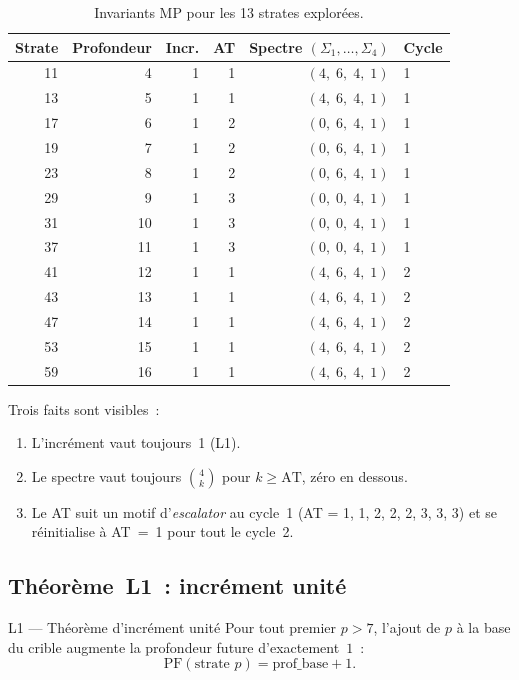 \documentclass[12pt,a4paper]{article}
\begin{document}
\begin{table}[htbp]
\centering
\caption{Invariants MP pour les 13 strates explorées.}
\label{tab:PM_shells}
\begin{tabular}{rrrrrl}
\toprule
Strate & Profondeur & Incr. & AT & Spectre $(\Sigma_1,\ldots,\Sigma_4)$ & Cycle \\
\midrule
11 &  4 & 1 & 1 & $(4,\;6,\;4,\;1)$ & 1 \\
13 &  5 & 1 & 1 & $(4,\;6,\;4,\;1)$ & 1 \\
17 &  6 & 1 & 2 & $(0,\;6,\;4,\;1)$ & 1 \\
19 &  7 & 1 & 2 & $(0,\;6,\;4,\;1)$ & 1 \\
23 &  8 & 1 & 2 & $(0,\;6,\;4,\;1)$ & 1 \\
29 &  9 & 1 & 3 & $(0,\;0,\;4,\;1)$ & 1 \\
31 & 10 & 1 & 3 & $(0,\;0,\;4,\;1)$ & 1 \\
37 & 11 & 1 & 3 & $(0,\;0,\;4,\;1)$ & 1 \\
41 & 12 & 1 & 1 & $(4,\;6,\;4,\;1)$ & 2 \\
43 & 13 & 1 & 1 & $(4,\;6,\;4,\;1)$ & 2 \\
47 & 14 & 1 & 1 & $(4,\;6,\;4,\;1)$ & 2 \\
53 & 15 & 1 & 1 & $(4,\;6,\;4,\;1)$ & 2 \\
59 & 16 & 1 & 1 & $(4,\;6,\;4,\;1)$ & 2 \\
\bottomrule
\end{tabular}
\end{table}

Trois faits sont visibles~:
\begin{enumerate}[nosep]
  \item L'incrément vaut toujours~1 (L1).
  \item Le spectre vaut toujours $\binom{4}{k}$ pour
    $k \ge \mathrm{AT}$, zéro en dessous.
  \item Le AT suit un motif d'\emph{escalator} au cycle~1
    (AT = 1, 1, 2, 2, 2, 3, 3, 3) et se réinitialise à AT~=~1 pour
    tout le cycle~2.
\end{enumerate}


\subsection{Théorème~L1~: incrément unité}
\label{sec:PM_L1}

\begin{thmbox}{L1 --- Théorème d'incrément unité}
\label{thm:L1}
Pour tout premier $p > 7$, l'ajout de $p$ à la base du crible
augmente la profondeur future d'exactement~$1$~:
\[
  \mathrm{PF}(\text{strate } p) = \mathrm{prof\_base} + 1.
\]
\end{thmbox}
\end{document}
